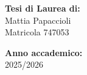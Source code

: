 \begin{titlepage}
\begin{minipage}[t]{1\textwidth}
\begin{multicols}{2}
         \columnbreak
         \columnbreak

         \begin{flushright}
            {\normalsize{\textbf{Tesi di Laurea di:}}{\normalsize\vspace{1mm}
            \\ \normalsize{Mattia Papaccioli}\\
            \normalsize{Matricola  747053 }}} \\
         \end{flushright}
    \end{multicols}
\end{minipage}

\begin{center}
    {\normalsize{\textbf{Anno accademico:}}{\normalsize\vspace{1mm}
    \\ \normalsize{2025/2026}}}  
\end{center}

\end{titlepage}
